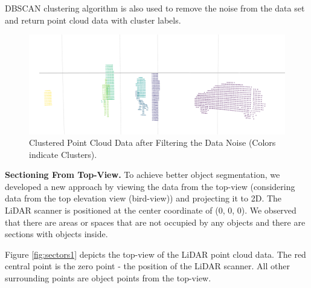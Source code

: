 DBSCAN clustering algorithm is also used to remove the noise from the data set and return point cloud data with cluster labels.


\begin{figure}[!h]
\begin{center}
  \includegraphics[width=.55\linewidth]{./images/seg_noise_removal.png}
  \caption{Clustered Point Cloud Data after Filtering the Data Noise (Colors indicate Clusters). }
  \label{fig:ClusteringWithNoiseFiltering}
\end{center}
\end{figure}



\textbf{Sectioning From Top-View.}
To achieve better object segmentation, we developed a new approach by viewing the data from the top-view (considering data from the top elevation view (bird-view)) and projecting it to 2D. The LiDAR scanner is positioned at the center coordinate
of (0, 0, 0).  We observed that there are areas or spaces that are not occupied by any
objects and there are sections with objects inside.

Figure \ref{fig:sectors1} depicts the top-view of the LiDAR point cloud data.
The red central point is the zero point - the position of the LiDAR scanner.
All other surrounding points are object points from the top-view.

